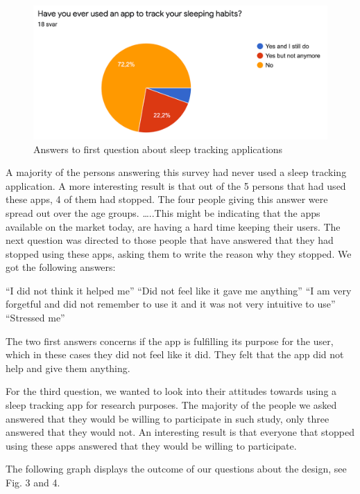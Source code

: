 \documentclass{article}
\begin{document}
\begin{figure}[!h]
  \begin{center}
    \includegraphics[scale=0.8]{Diagram1.png}
    \caption{Answers to first question about sleep tracking applications
}
    \label{fig:diagram1}
  \end{center}
\end{figure}

A majority of the persons answering this survey had never used a sleep tracking application. A more interesting result is that out of the 5 persons that had used these apps, 4 of them had stopped. The four people giving this answer were spread out over the age groups. …..This might be indicating that the apps available on the market today, are having a hard time keeping their users. The next question was directed to those people that have answered that they had stopped using these apps, asking them to write the reason why they stopped. We got the following answers:

“I did not think it helped me”
“Did not feel like it gave me anything”
“I am very forgetful and did not remember to use it and it was not very intuitive to use”
“Stressed me”

The two first answers concerns if the app is fulfilling its purpose for the user, which in these cases they did not feel like it did. They felt that the app did not help and give them anything. 

For the third question, we wanted to look into their attitudes towards using a sleep tracking app for research purposes. The majority of the people we asked answered that they would be willing to participate in such study, only three answered that they would not. An interesting result is that everyone that stopped using these apps answered that they would be willing to participate. 

The following graph displays the outcome of our questions about the design, see Fig. 3 and 4. 
\end{document}
